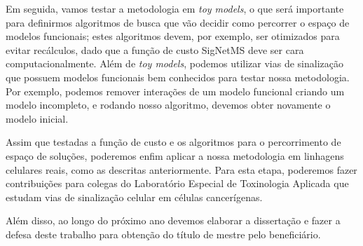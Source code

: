 \documentclass[12pt]{article}
\newcommand{\foreignword}[1]{\textit{#1}}
\begin{document}
Em seguida, vamos testar a metodologia em 
\foreignword{toy models}, o que será importante para definirmos 
algoritmos de busca que vão decidir como percorrer o espaço de modelos
funcionais; estes algoritmos devem, por exemplo, ser otimizados para 
evitar recálculos, dado que a função de custo SigNetMS deve ser cara
computacionalmente. Além de \foreignword{toy models}, podemos utilizar 
vias de sinalização que possuem modelos funcionais bem conhecidos para 
testar nossa metodologia. Por exemplo, podemos remover interações de um 
modelo funcional criando um modelo incompleto, e rodando nosso 
algoritmo, devemos obter novamente o modelo inicial.

Assim que testadas a função de custo e os algoritmos para o 
percorrimento de espaço de soluções, poderemos enfim aplicar a nossa 
metodologia em linhagens celulares reais, como as descritas 
anteriormente. Para esta etapa, poderemos fazer contribuições para 
colegas do Laboratório Especial de Toxinologia Aplicada que estudam
vias de sinalização celular em células cancerígenas.

Além disso, ao longo do próximo ano devemos elaborar a dissertação e 
fazer a defesa deste trabalho para obtenção do título de mestre pelo
beneficiário.
\end{document}
